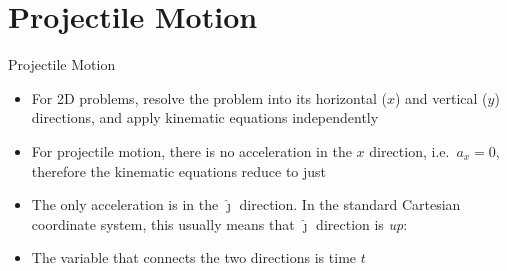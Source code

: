 \documentclass[12pt,compress,aspectratio=169]{beamer}
\newcommand{\mb}[1]{\ensuremath\mathbf{#1}}
\newcommand{\eq}[2]{\vspace{#1}{\Large\begin{displaymath}#2\end{displaymath}}}
\begin{document}
%  
%


\section{Projectile Motion}

\begin{frame}{Projectile Motion}
  \begin{itemize}
  \item For 2D problems, resolve the problem into its
    horizontal ($x$) and vertical ($y$) directions, and apply kinematic
    equations independently
  \item For projectile motion, there is no acceleration in the $x$ direction,
    i.e.\ $a_x=0$, therefore the kinematic equations reduce to just
    
    \eq{-.25in}{x=v_xt\bm{\hat{\imath}}}
  \item The only acceleration is in the $\bm{\hat{\jmath}}$ direction. In the
    standard Cartesian coordinate system, this usually means that
    $\bm{\hat{\jmath}}$ direction is \emph{up}:
    
    \eq{-.25in}{a_y=-g\bm{\hat{\jmath}}}
  \item The variable that connects the two directions is time $t$
  \end{itemize}
\end{frame}
\end{document}
